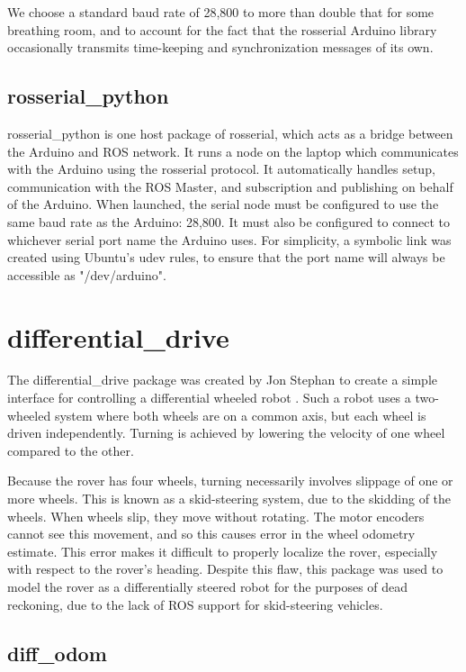 We choose a standard baud rate of 28,800 to more than double that for some breathing room, and to account for the fact that the rosserial Arduino library occasionally transmits time-keeping and synchronization messages of its own.

\subsection{rosserial\_python}
rosserial\_python is one host package of rosserial, which acts as a bridge between the Arduino and ROS network. It runs a node on the laptop which communicates with the Arduino using the rosserial protocol. It automatically handles setup, communication with the ROS Master, and subscription and publishing on behalf of the Arduino. When launched, the serial node must be configured to use the same baud rate as the Arduino: 28,800. It must also be configured to connect to whichever serial port name the Arduino uses. For simplicity, a symbolic link was created using Ubuntu's udev rules, to ensure that the port name will always be accessible as "/dev/arduino". %

\section{differential\_drive}
The differential\_drive package was created by Jon Stephan to create a simple interface for controlling a differential wheeled robot \cite{differentialDrivePackage}. Such a robot uses a two-wheeled system where both wheels are on a common axis, but each wheel is driven independently. Turning is achieved by lowering the velocity of one wheel compared to the other.

Because the rover has four wheels, turning necessarily involves slippage of one or more wheels. This is known as a skid-steering system, due to the skidding of the wheels. When wheels slip, they move without rotating. The motor encoders cannot see this movement, and so this causes error in the wheel odometry estimate. This error makes it difficult to properly localize the rover, especially with respect to the rover's heading. Despite this flaw, this package was used to model the rover as a differentially steered robot for the purposes of dead reckoning, due to the lack of ROS support for skid-steering vehicles.

\subsection{diff\_odom} \label{sectionOdomPublishing}

